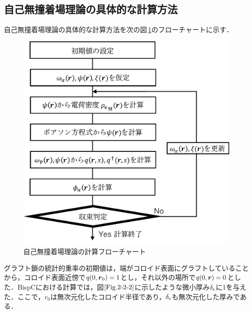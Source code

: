 \documentclass[10.5pt,a4j]{jarticle}
\newcommand{\bvec}[1]{
\mbox{\boldmath $#1$}
}%
\begin{document}
\subsection{自己無撞着場理論の具体的な計算方法}
自己無撞着場理論の具体的な計算方法を次の図\,\ref{Fig.2-2-1}のフローチャートに示す．
%
\begin{figure}[H]
            \centering
            \includegraphics[keepaspectratio,scale=0.5]{Fig/Fig.2/SimulationMethod.pdf}
            \caption{自己無撞着場理論の計算フローチャート}
            \label{Fig.2-2-1}
\end{figure}
%
%
グラフト鎖の統計的重率の初期値は，端がコロイド表面にグラフトしていることから，コロイド表面近傍で$q(0,\bvec{r}_0)=1$とし，それ以外の場所で$q(0,\bvec{r})=0$とした．BispCにおける計算では，図$\ref{Fig.2-2-2}$に示したような微小厚み$\delta_{\rm{s}}$に1を与えた．ここで，$r_0$は無次元化したコロイド半径であり，$\delta_{\rm{s}}$も無次元化した厚みである．
%
\end{document}
